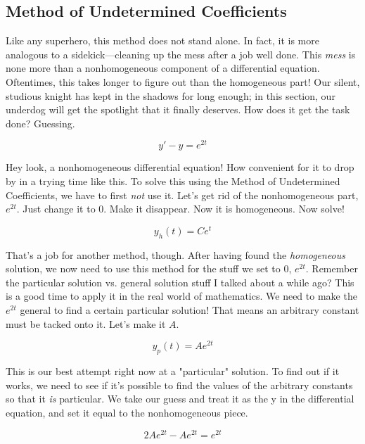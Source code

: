 \documentclass[10pt]{extarticle}
\begin{document}
\begin{multicols}{2}
\subsection{Method of Undetermined Coefficients}

Like any superhero, this method does not stand alone. In fact, it is more
analogous to a sidekick---cleaning up the mess after a job well done. This {\em
mess} is none more than a nonhomogeneous component of a differential equation.
Oftentimes, this takes longer to figure out than the homogeneous part! Our
silent, studious knight has kept in the shadows for long enough; in this
section, our underdog will get the spotlight that it finally deserves. How does
it get the task done? Guessing.

\begin{equation*}
    y' - y = e^{2t}
\end{equation*}

Hey look, a nonhomogeneous differential equation! How convenient for it to drop
by in a trying time like this. To solve this using the Method of Undetermined
Coefficients, we have to first {\em not} use it. Let's get rid of the
nonhomogeneous part, \(e^{2t}\). Just change it to 0. Make it disappear. Now it
is homogeneous. Now solve!
    
\begin{equation*}
    y_h(t) = Ce^t
\end{equation*}

That's a job for another method, though. After having found the {\em
homogeneous} solution, we now need to use this method for the stuff we set to
0, \(e^{2t}\). Remember the particular solution vs. general solution stuff I
talked about a while ago? This is a good time to apply it in the real world of
mathematics. We need to make the \(e^{2t}\) general to find a certain
particular solution! That means an arbitrary constant must be tacked onto it.
Let's make it \(A\).

\begin{equation*}
    y_p(t) = Ae^{2t}
\end{equation*}

This is our best attempt right now at a "particular" solution. To find out if
it works, we need to see if it's possible to find the values of the arbitrary
constants so that it {\em is} particular. We take our guess and treat it as the
y in the differential equation, and set it equal to the nonhomogeneous piece. 

\begin{equation*}
    2Ae^{2t} - Ae^{2t} = e^{2t}
\end{equation*}


\end{multicols}
\end{document}
